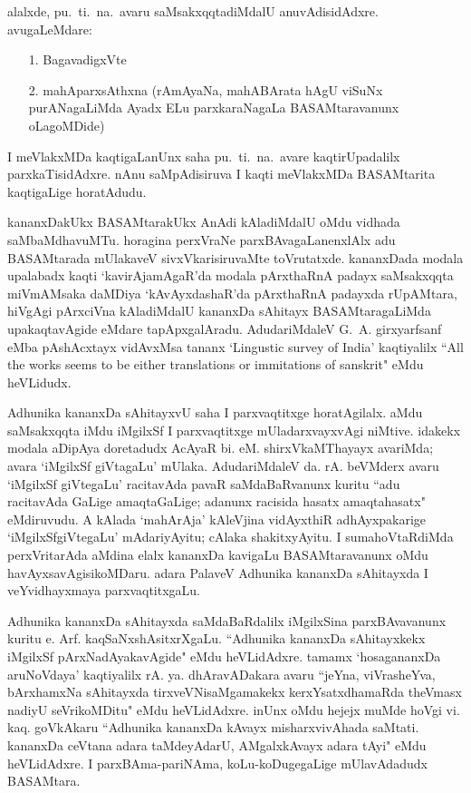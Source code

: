 \newpage

alalxde, pu.~ti.~na.~avaru saMsakxqqtadiMdalU anuvAdisidAdxre. avugaLeMdare:
\begin{itemize}
\item[1.] BagavadigxVte
\item[2.] mahAparxsAthxna (rAmAyaNa, mahABArata hAgU viSuNx purANagaLiMda Ayadx ELu parxkaraNagaLa BASAMtaravanunx oLagoMDide)
\end{itemize}

I meVlakxMDa kaqtigaLanUnx saha pu.~ti.~na.~avare kaqtirUpadalilx parxkaTisidAdxre. nAnu saMpAdisiruva I kaqti meVlakxMDa BASAMtarita kaqtigaLige horatAdudu.

kananxDakUkx BASAMtarakUkx AnAdi kAladiMdalU oMdu vidhada saMbaMdhavuMTu. horagina perxVraNe parxBAvagaLanenxlAlx adu BASAMtarada mUlakaveV sivxVkarisiruvaMte toVrutatxde. kananxDada modala upalabadx kaqti `kavirAjamAgaR'da modala pArxthaRnA padayx saMsakxqqta miVmAMsaka daMDiya `kAvAyxdashaR'da pArxthaRnA padayxda rUpAMtara, hiVgAgi pArxciVna kAladiMdalU kananxDa sAhitayx BASAMtaragaLiMda upakaqtavAgide eMdare tapApxgalAradu. AdudariMdaleV {\rm G.~A.} girxyarfsanf eMba pAshAcxtayx vidAvxMsa tananx {\rm `Lingustic survey of India'} kaqtiyalilx {\rm ``All the works seems to be either translations or immitations of sanskrit"} eMdu heVLidudx.

Adhunika kananxDa sAhitayxvU saha I parxvaqtitxge horatAgilalx. aMdu saMsakxqqta iMdu iMgilxSf I parxvaqtitxge mUladarxvayxvAgi niMtive. idakekx modala aDipAya doretadudx AcAyaR bi. eM. shirxVkaMThayayx avariMda; avara `iMgilxSf giVtagaLu' mUlaka. AdudariMdaleV da. rA. beVMderx avaru `iMgilxSf giVtegaLu' racitavAda pavaR saMdaBaRvanunx kuritu ``adu racitavAda  GaLige amaqtaGaLige; adanunx racisida hasatx amaqtahasatx" eMdiruvudu. A kAlada `mahArAja' kAleVjina vidAyxthiR adhAyxpakarige `iMgilxSfgiVtegaLu' mAdariyAyitu; cAlaka shakitxyAyitu. I sumahoVtaRdiMda perxVritarAda aMdina elalx kananxDa kavigaLu BASAMtaravanunx oMdu havAyxsavAgisikoMDaru. adara PalaveV Adhunika kananxDa sAhitayxda I veYvidhayxmaya parxvaqtitxgaLu.

Adhunika kananxDa sAhitayxda saMdaBaRdalilx iMgilxSina parxBAvavanunx kuritu e. Arf. kaqSaNxshAsitxrXgaLu. ``Adhunika kananxDa sAhitayxkekx iMgilxSf pArxNadAyakavAgide" eMdu heVLidAdxre. tamamx `hosagananxDa aruNoVdaya' kaqtiyalilx rA. ya. dhAravADakara avaru ``jeYna, viVrasheYva, bArxhamxNa sAhitayxda tirxveVNisaMgamakekx kerxYsatxdhamaRda theVmasx nadiyU seVrikoMDitu" eMdu heVLidAdxre. inUnx oMdu hejejx muMde hoVgi vi. kaq. goVkAkaru ``Adhunika kananxDa kAvayx misharxvivAhada saMtati. kananxDa ceVtana adara taMdeyAdarU, AMgalxkAvayx adara tAyi" eMdu heVLidAdxre. I parxBAma-pariNAma, koLu-koDugegaLige mUlavAdadudx BASAMtara.  

